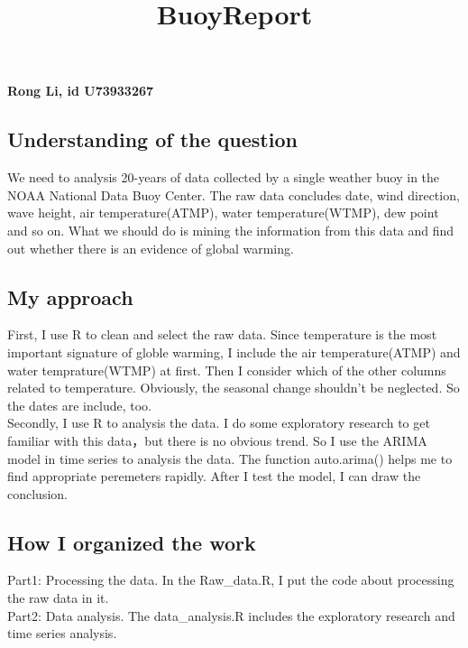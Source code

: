 \documentclass[]{article}
\title{BuoyReport}
\author{}
\date{\vspace{-2.5em}}
\let\oldparagraph\paragraph
\renewcommand{\paragraph}[1]{\oldparagraph{#1}\mbox{}}
\begin{document}
\maketitle

\hypertarget{rong-li-id-u73933267}{%
\paragraph{Rong Li, id U73933267}\label{rong-li-id-u73933267}}

\hypertarget{understanding-of-the-question}{%
\subsection{Understanding of the
question}\label{understanding-of-the-question}}

We need to analysis 20-years of data collected by a single weather buoy
in the NOAA National Data Buoy Center. The raw data concludes date, wind
direction, wave height, air temperature(ATMP), water temperature(WTMP),
dew point and so on. What we should do is mining the information from
this data and find out whether there is an evidence of global warming.

\hypertarget{my-approach}{%
\subsection{My approach}\label{my-approach}}

First, I use R to clean and select the raw data. Since temperature is
the most important signature of globle warming, I include the air
temperature(ATMP) and water temprature(WTMP) at first. Then I consider
which of the other columns related to temperature. Obviously, the
seasonal change shouldn't be neglected. So the dates are include, too.\\
Secondly, I use R to analysis the data. I do some exploratory research
to get familiar with this data，but there is no obvious trend. So I use
the ARIMA model in time series to analysis the data. The function
auto.arima() helps me to find appropriate peremeters rapidly. After I
test the model, I can draw the conclusion.

\hypertarget{how-i-organized-the-work}{%
\subsection{How I organized the work}\label{how-i-organized-the-work}}

Part1: Processing the data. In the Raw\_data.R, I put the code about
processing the raw data in it.\\
Part2: Data analysis. The data\_analysis.R includes the exploratory
research and time series analysis.
\end{document}
